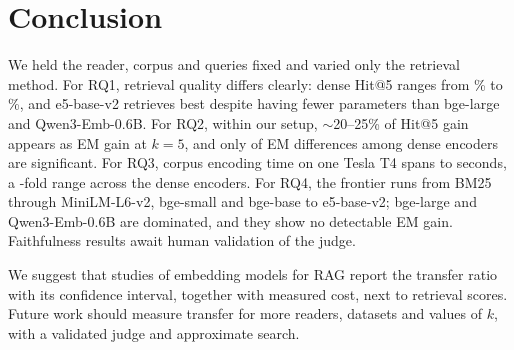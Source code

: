\section{Conclusion}
\label{sec:conclusion}

We held the reader, corpus and queries fixed and varied only the retrieval method.
For RQ1, retrieval quality differs clearly: dense Hit@5 ranges from \% to \%, and e5-base-v2 retrieves best despite having fewer parameters than bge-large and Qwen3-Emb-0.6B.
For RQ2, within our setup, $\sim$20--25\% of Hit@5 gain appears as EM gain at $k{=}5$, and only  of  EM differences among dense encoders are significant.
For RQ3, corpus encoding time on one Tesla T4 spans  to  seconds, a -fold range across the dense encoders.
For RQ4, the frontier runs from BM25 through MiniLM-L6-v2, bge-small and bge-base to e5-base-v2; bge-large and Qwen3-Emb-0.6B are dominated, and they show no detectable EM gain.
Faithfulness results await human validation of the judge.

We suggest that studies of embedding models for RAG report the transfer ratio with its confidence interval, together with measured cost, next to retrieval scores.
Future work should measure transfer for more readers, datasets and values of $k$, with a validated judge and approximate search.
